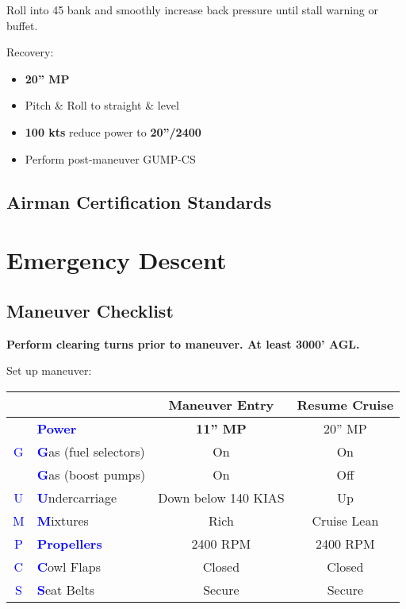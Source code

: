 {Roll into 45\degree{} bank and smoothly increase back pressure until stall warning or buffet.

Recovery:
\begin{itemize}[label={}]
\item \textbf{20'' MP}
\item Pitch \& Roll to straight \& level
\item \textbf{100 kts} reduce power to \textbf{20''/2400}
\item Perform post-maneuver GUMP-CS
\end{itemize}
\subsection{Airman Certification Standards}
\newpage

\section{Emergency Descent}
\subsection{Maneuver Checklist}

\textbf{Perform clearing turns prior to maneuver. At least 3000' AGL.}

Set up maneuver:

\begin{table}[H]
\centering
\begin{tabular}{|c|l|c|c|}
\hline
                    &                                                 & \textbf{Maneuver Entry} & \textbf{Resume Cruise} \\ \hline
                    & \textcolor{blue}{\textbf{Power}}                & \textbf{11'' MP}        & 20'' MP                \\ \hline
\textcolor{blue}{G} & \textcolor{blue}{\textbf{G}}as (fuel selectors) & On                      & On                     \\
                    & \textcolor{blue}{\textbf{G}}as (boost pumps)    & On                      & Off                    \\ \hline
\textcolor{blue}{U} & \textcolor{blue}{\textbf{U}}ndercarriage        & Down below 140 KIAS     & Up                     \\ \hline
\textcolor{blue}{M} & \textcolor{blue}{\textbf{M}}ixtures             & Rich                    & Cruise Lean            \\ \hline
\textcolor{blue}{P} & \textcolor{blue}{\textbf{Propellers}}           & 2400 RPM                & 2400 RPM               \\ \hline
\textcolor{blue}{C} & \textcolor{blue}{\textbf{C}}owl Flaps           & Closed                  & Closed                 \\ \hline
\textcolor{blue}{S} & \textcolor{blue}{\textbf{S}}eat Belts           & Secure                  & Secure                 \\ \hline
\end{tabular}
\end{table}

}
